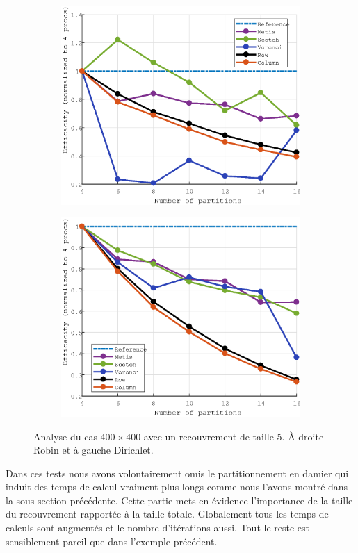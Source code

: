 \documentclass[a4paper,11pt]{article}
\begin{document}
\vspace*{-8mm}
\begin{figure}[H]\ContinuedFloat
	\begin{subfigure}[t]{0.45\textwidth}
		\centering
		\includegraphics[width=\textwidth]{robin_400x400_5_efficacity.eps}
	\end{subfigure}
	\hfill
	\begin{subfigure}[t]{0.45\textwidth}
		\centering
		\includegraphics[width=\textwidth]{dirichlet_400x400_10_efficacity.eps}
	\end{subfigure}
	\caption{Analyse du cas $400\times400$ avec un recouvrement de taille 5. À droite Robin et à gauche Dirichlet.}
\end{figure}
\noindent Dans ces tests nous avons volontairement omis le partitionnement en damier qui induit des temps de calcul vraiment plus longs comme nous l'avons montré dans la sous-section précédente. Cette partie mets en évidence l'importance de la taille du recouvrement rapportée à la taille totale. Globalement tous les temps de calculs sont augmentés et le nombre d'itérations aussi. Tout le reste est sensiblement pareil que dans l'exemple précédent.
\end{document}
